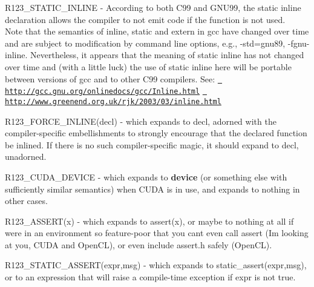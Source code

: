 \begin{DoxyItemize}
\item R123\+\_\+\+S\+T\+A\+T\+I\+C\+\_\+\+I\+N\+L\+I\+NE -\/ According to both C99 and G\+N\+U99, the \textquotesingle{}static inline\textquotesingle{} declaration allows the compiler to not emit code if the function is not used. ~\newline
 Note that the semantics of \textquotesingle{}inline\textquotesingle{}, \textquotesingle{}static\textquotesingle{} and \textquotesingle{}extern\textquotesingle{} in gcc have changed over time and are subject to modification by command line options, e.\+g., -\/std=gnu89, -\/fgnu-\/inline. Nevertheless, it appears that the meaning of \textquotesingle{}static inline\textquotesingle{} has not changed over time and (with a little luck) the use of \textquotesingle{}static inline\textquotesingle{} here will be portable between versions of gcc and to other C99 compilers. See\+: \href{http://gcc.gnu.org/onlinedocs/gcc/Inline.html}{\texttt{ http\+://gcc.\+gnu.\+org/onlinedocs/gcc/\+Inline.\+html}} \href{http://www.greenend.org.uk/rjk/2003/03/inline.html}{\texttt{ http\+://www.\+greenend.\+org.\+uk/rjk/2003/03/inline.\+html}}


\item R123\+\_\+\+F\+O\+R\+C\+E\+\_\+\+I\+N\+L\+I\+N\+E(decl) -\/ which expands to \textquotesingle{}decl\textquotesingle{}, adorned with the compiler-\/specific embellishments to strongly encourage that the declared function be inlined. If there is no such compiler-\/specific magic, it should expand to decl, unadorned.


\item R123\+\_\+\+C\+U\+D\+A\+\_\+\+D\+E\+V\+I\+CE -\/ which expands to {\bfseries{device}} (or something else with sufficiently similar semantics) when C\+U\+DA is in use, and expands to nothing in other cases.


\item R123\+\_\+\+A\+S\+S\+E\+R\+T(x) -\/ which expands to assert(x), or maybe to nothing at all if we\textquotesingle{}re in an environment so feature-\/poor that you can\textquotesingle{}t even call assert (I\textquotesingle{}m looking at you, C\+U\+DA and Open\+CL), or even include assert.\+h safely (Open\+CL).


\item R123\+\_\+\+S\+T\+A\+T\+I\+C\+\_\+\+A\+S\+S\+E\+R\+T(expr,msg) -\/ which expands to static\+\_\+assert(expr,msg), or to an expression that will raise a compile-\/time exception if expr is not true.



\end{DoxyItemize}
